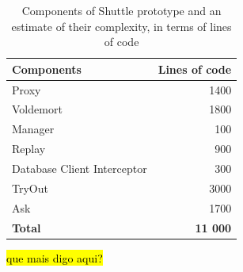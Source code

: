 \begin{table}[ht]
\begin{tabular}{lr}
\textbf{Components} 		& \textbf{Lines of code} \\ \hline
Proxy                      	& 1400    			\\   
Voldemort                  	& 1800    			\\
Manager                    	& 100     			\\    
Replay 			           	& 900     			\\    
Database Client Interceptor & 300     			\\     
TryOut                      & 3000    			\\    
Ask                         & 1700    			\\  \hline  
\textbf{Total}              & \textbf{11 000}  \\        
\end{tabular}
	\caption[Components of Shuttle prototype and an estimate of their complexity]
			{Components of Shuttle prototype and an estimate of their complexity, in terms of lines of code}
	\label{tab:lines_of_code}
\end{table}

\hl{que mais digo aqui?}

